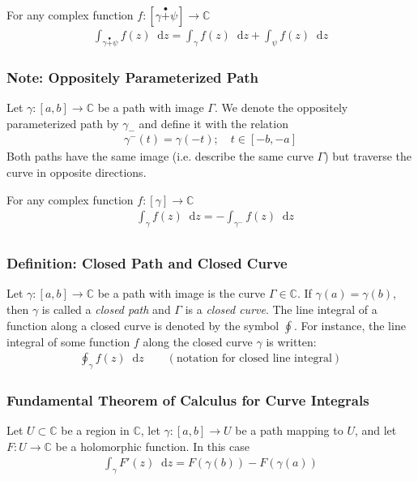 \documentclass[11pt, a4paper]{article}
\newcommand{\diff}{\mathop{}\!\mathrm{d}} %
\newcommand{\C}{\mathbb{C}} %
\begin{document}
For any complex function $ f : [\gamma \stackrel{\bullet}{+} \psi] \to \C $
\begin{align*}
	\int_{\gamma \stackrel{\bullet}{+} \psi} f(z) \diff z = \int_{\gamma}f(z)\diff z + \int_{\psi}f(z) \diff z
\end{align*}

\subsubsection{Note: Oppositely Parameterized Path}
Let $ \gamma : [a, b] \to \C $ be a path with image $ \Gamma $. We denote the oppositely parameterized path by $ \gamma_{-} $ and define it with the relation
\begin{align*}
	\gamma^{-}(t) = \gamma(-t); \quad t \in [-b, -a]
\end{align*}
Both paths have the same image (i.e. describe the same curve $ \Gamma $) but traverse the curve in opposite directions.

For any complex function $ f : [\gamma] \to \C $
\begin{align*}
	&\int_{\gamma} f(z) \diff z = - \int_{\gamma^{-}}f(z) \diff z\\
	&
\end{align*}

\subsubsection{Definition: Closed Path and Closed Curve}
Let $ \gamma : [a, b] \to \C $ be a path with image is the curve $ \Gamma \in \C$. If $ \gamma(a) = \gamma(b) $, then $\gamma$ is called a \textit{closed path} and $ \Gamma $ is a \textit{closed curve}. The line integral of a function along a closed curve is denoted by the symbol $ \oint $. For instance, the line integral of some function $ f $ along the closed curve $ \gamma $ is written:
\begin{align*}
	\oint_{\gamma} f(z) \diff z \qquad (\text{notation for closed line integral})
\end{align*}

\subsubsection{Fundamental Theorem of Calculus for Curve Integrals}
Let $ U \subset \C $ be a region in $ \C $, let $ \gamma : [a, b] \to U $ be a path mapping to $ U $, and let $ F:U \to \C $ be a holomorphic function. In this case
\begin{align*}
	\int_{\gamma} F'(z) \diff z = F\left(\gamma(b)\right) - F\left(\gamma(a)\right)
\end{align*}
\end{document}
